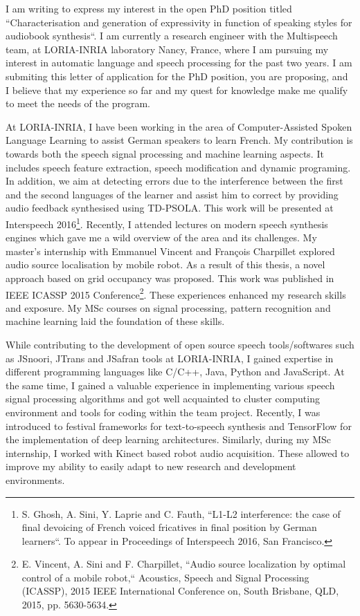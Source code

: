 \documentclass[12pt,stdletter,orderfromtodate,sigleft]{newlfm}
\begin{document}
\begin{newlfm}
I am writing to express my interest in the open PhD position titled ``Characterisation  and  generation  of  expressivity  in  function  of  speaking  styles  for  audiobook 
synthesis``. I am currently a research engineer with the Multispeech team, at LORIA-INRIA laboratory Nancy, France, where I am pursuing my interest in automatic language and speech processing for the past two years. I am submiting this letter of application for the PhD position, you are proposing, and I believe that my experience so far and my quest for knowledge make me qualify to meet the needs of the program. 
		
At LORIA-INRIA, I have been working in the area of Computer-Assisted Spoken Language Learning to assist German speakers to learn French. My contribution is towards both the speech signal processing and machine learning aspects. It includes speech feature extraction, speech modification and dynamic programing. In addition, we aim at detecting errors due to the interference between the first and the second languages of the learner and assist him to correct by providing audio feedback synthesised using TD\--PSOLA. This work will be presented at Interspeech 2016\footnote{S. Ghosh, A. Sini, Y. Laprie and C. Fauth, ``L1-L2 interference: the case of final devoicing of French voiced fricatives in final position by German learners``. To appear in Proceedings of Interspeech 2016, San Francisco.}. Recently, I attended lectures on modern speech synthesis engines which gave me a wild overview of the area and its challenges. My master's internship with Emmanuel Vincent and François Charpillet explored audio source localisation by mobile robot. As a result of this thesis, a novel approach based on grid occupancy was proposed. This work was published in IEEE ICASSP 2015 Conference\footnote{E. Vincent, A. Sini and F. Charpillet, ``Audio source localization by optimal control of a mobile robot,`` Acoustics, Speech and Signal Processing (ICASSP), 2015 IEEE International Conference on, South Brisbane, QLD, 2015, pp. 5630-5634.}. These experiences enhanced my research skills and exposure. My MSc courses on signal processing, pattern recognition and machine learning laid the foundation of these skills.   

		
While contributing to the development of open source speech tools/softwares such as JSnoori, JTrans and JSafran tools at LORIA-INRIA, I gained expertise in different programming languages like C/C++, Java, Python and JavaScript. At the same time, I gained a valuable experience in implementing  various speech signal processing algorithms and got well acquainted 	to cluster computing environment	and tools for coding within the team project. Recently, I was introduced to festival frameworks for text\--to\--speech synthesis and TensorFlow for the implementation of deep learning architectures. Similarly, during my MSc internship, I worked with Kinect based robot audio acquisition. These allowed to improve my ability to easily adapt to new research and development environments.    


\end{newlfm}
\end{document}
